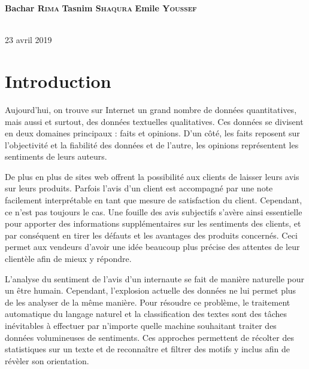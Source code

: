 \documentclass[12pt,a4paper]{report}
\theoremstyle{definition}
\begin{document}
\begin{titlepage}
\begin{minipage}{0.4\textwidth}
\centering \Large
\textbf{Bachar \textsc{Rima}} %
\textbf{Tasnim \textsc{Shaqura}} %
\textbf{Emile \textsc{Youssef}} %
\end{minipage} \\[0.8cm]

{\large 23 avril 2019}\\[1cm]
\hspace{\fill}
\vfill %
\end{titlepage}

\tableofcontents
\cleardoublepage

\setcounter{page}{1}
\chapter{Introduction}
Aujourd'hui, on trouve sur Internet un grand nombre de données quantitatives, mais aussi et surtout, des données textuelles qualitatives. Ces données se divisent en deux domaines principaux : faits et opinions. D'un côté, les faits reposent sur l'objectivité et la fiabilité des données et de
l'autre, les opinions représentent les sentiments de leurs auteurs.

De plus en plus de sites web offrent la possibilité aux clients de laisser leurs avis sur leurs produits. Parfois l'avis d'un client est  accompagné par une note facilement interprétable en tant que mesure de satisfaction du client. Cependant, ce n'est pas toujours le cas. Une fouille des avis subjectifs s'avère ainsi essentielle pour apporter des informations supplémentaires sur les sentiments des clients, et par conséquent en tirer les défauts et les avantages des produits concernés. Ceci permet aux vendeurs d'avoir une idée beaucoup plus précise des attentes de leur clientèle afin de mieux y répondre.

L'analyse du sentiment de l'avis d'un internaute se fait de manière naturelle pour un être humain. Cependant, l'explosion actuelle des données ne lui permet plus de les analyser de la même manière. Pour résoudre ce problème, le traitement automatique du langage naturel et la classification des textes sont des tâches inévitables à effectuer par n'importe quelle machine souhaitant traiter des données volumineuses de sentiments. Ces approches permettent de récolter des statistiques sur un texte et de reconnaître et filtrer des motifs y inclus afin de révèler son orientation.
\end{document}
